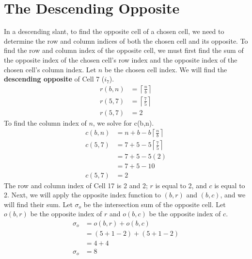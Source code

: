 \documentclass[letterpaper, twoside,12pt]{book}
\begin{document}
    \section{The Descending Opposite}
    In a descending slant, to find the opposite cell of a chosen cell, we need to determine the row and column indices of both the chosen cell and its opposite. To find the row and column index of the opposite cell, we must first find the sum of the opposite index of the chosen cell's row index and the opposite index of the chosen cell's column index. Let $n$ be the chosen cell index. We will find the \textbf{descending opposite} of Cell 7 ($i_{7}$).
    \begin{equation}
        \begin{split}
            r(b,n) &= \left\lceil \frac{n}{b}\right\rceil \\
            r(5,7) &= \left\lceil \frac{7}{5}\right\rceil \\
            r(5,7) &= 2
        \end{split}
    \end{equation}
    To find the column index of $n$, we solve for c(b,n).
    \begin{equation}
        \begin{split}
            c(b,n) &= n + b - b\left\lceil \frac{n}{b}\right\rceil \\
            c(5,7) &= 7 + 5 - 5\left\lceil \frac{7}{5}\right\rceil \\
                &= 7 + 5 - 5(2) \\
                &= 7 + 5 - 10 \\
            c(5,7) &= 2
        \end{split}
    \end{equation}
    The row and column index of Cell 17 is 2 and 2; $r$ is equal to 2, and $c$ is equal to 2. Next, we will apply the opposite index function to $(b,r)$ and $(b,c)$, and we will find their sum. Let $\sigma_o$ be the intersection sum of the opposite cell. Let $o(b,r)$ be the opposite index of $r$ and $o(b,c)$ be the opposite index of $c$.
    \begin{equation}
        \begin{split}
            \sigma_o &= o(b,r) + o(b,c) \\
                &= (5 + 1 - 2) + (5 + 1 - 2) \\
                &= 4 + 4 \\
            \sigma_o &= 8 \\
        \end{split}
    \end{equation}
\end{document}
